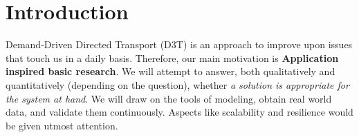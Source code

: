 \section*{Introduction}
Demand-Driven Directed Transport (D3T) is an approach to improve upon issues that touch us in a daily basis. Therefore, our main motivation is
{\bf Application inspired basic research}. We will attempt to answer, both qualitatively and quantitatively (depending on the question), whether 
\emph{a solution is appropriate for the system at hand}. We will draw on the tools of modeling, obtain real world data, and validate them continuously. 
Aspects like scalability and resilience would be given utmost attention. 